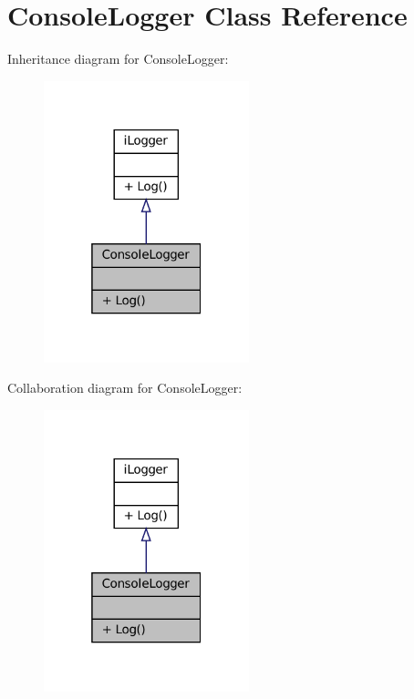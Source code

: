 \hypertarget{classConsoleLogger}{}\section{Console\+Logger Class Reference}
\label{classConsoleLogger}


Inheritance diagram for Console\+Logger\+:\nopagebreak
\begin{figure}[H]
\begin{center}
\leavevmode
\includegraphics[width=169pt]{classConsoleLogger__inherit__graph}
\end{center}
\end{figure}


Collaboration diagram for Console\+Logger\+:\nopagebreak
\begin{figure}[H]
\begin{center}
\leavevmode
\includegraphics[width=169pt]{classConsoleLogger__coll__graph}
\end{center}
\end{figure}

